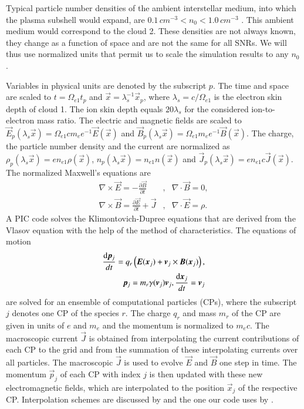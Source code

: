 \documentclass[structabstract]{aa}
\begin{document}
Typical particle number densities of the ambient interstellar medium, into 
which the plasma subshell would expand, are $0.1 \, cm^{-3} < n_0 < 1.0 \,
cm^{-3}$ \citep{Density,MagAmp1}. This ambient medium would correspond to 
the cloud 2. These densities are not always known, they change as a function 
of space and are not the same for all SNRs. We will thus use normalized 
units that permit us to scale the simulation results to any $n_0$. 

Variables in physical units are denoted by the subscript $p$. The time 
and space are scaled to $t = \Omega_{e1} t_p$ and $\vec{x} = \lambda_s^{-1} 
\vec{x}_p$, where $\lambda_s = c / \Omega_{e1}$ is the electron skin depth 
of cloud 1. The ion skin depth equals $20 \lambda_s$ for the considered
ion-to-electron mass ratio. The electric and magnetic fields are scaled to 
$\vec{E}_p (\lambda_s \vec{x}) = \Omega_{e1} c m_e e^{-1} \vec{E}(\vec{x})$ 
and $\vec{B}_p(\lambda_s \vec{x}) = \Omega_{e1} m_e e^{-1} \vec{B}(\vec{x})$. 
The charge, the particle number density and the current are normalized as 
$\rho_p (\lambda_s \vec{x}) = en_{e1} \rho (\vec{x})$, $n_p (\lambda_s \vec{x})
= n_{e1} n(\vec{x})$ and $\vec{J}_p (\lambda_s \vec{x}) = en_{e1}c 
\vec{J}(\vec{x})$. The normalized Maxwell's equations are 
\begin{eqnarray}
\nabla \times \vec{E} = -\frac{\partial \vec{B}}
{\partial t} & , & \nabla \cdot \vec{B} = 0, \\
\nabla \times \vec{B} = \frac{\partial \vec{E}}
{\partial t} + \vec{J} &,& \nabla \cdot \vec{E} = 
\rho.
\end{eqnarray}
A PIC code solves the Klimontovich-Dupree equations \citep{Dupree} that are 
derived from the Vlasov equation with the help of the method of characteristics.
The equations of motion 
\begin{eqnarray}
\frac{{\rm d}\vec{p}_j}{dt} = q_r \left ( \vec{E}(\vec{x}_j) + \vec{v}_j 
\times \vec{B}(\vec{x}_j) \right ), & \\ \vec{p}_j = m_r \gamma (\vec{v}_j) 
\vec{v}_j, \frac{{\rm d}\vec{x}_j}{dt} =\vec{v}_j
\end{eqnarray}
are solved for an ensemble of computational particles (CPs), where the 
subscript $j$ denotes one CP of the species $r$. The charge $q_r$ and 
mass $m_r$ of the CP are given in units of $e$ and $m_e$ and the momentum 
is normalized to $m_e c$. The macroscopic current $\vec{J}$ is obtained 
from interpolating the current contributions of each CP to the grid and 
from the summation of these interpolating currents over all particles. 
The macroscopic $\vec{J}$ is used to evolve $\vec{E}$ and $\vec{B}$ one
step in time. The momentum $\vec{p}_j$ of each CP with index $j$ is then 
updated with these new electromagnetic fields, which are interpolated to 
the position $\vec{x}_j$ of the respective CP. Interpolation schemes 
are discussed by \citet{Code2} and the one our code uses by \citet{Code1}.
\end{document}
